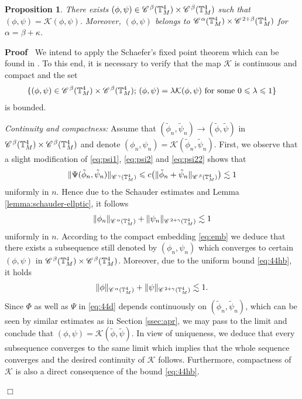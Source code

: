 \documentclass[a4paper,11pt]{article}
\newenvironment{proof}{\noindent\textbf{Proof\ }}{\hspace*{\fill}$\Box$\medskip}
\newtheorem{proposition}[theorem]{Proposition}
\numberwithin{equation}{section}
\newcommand{\CC}{\mathscr{C} \hspace{.1em}}
\newcommand{\8}{\infty}
\begin{document}
\begin{proposition}\label{prop:fixp}
There exists $(\phi,\psi)\in\CC^{\beta}(\mathbb{T}_{M}^{4})\times \CC^{\beta}(\mathbb{T}_{M}^{4})$ such that $(\phi,\psi)=\mathcal{K}(\phi,\psi).$ Moreover, $(\phi,\psi)$ belongs to $\CC^{\alpha} (\mathbb{T}_{M}^{4})\times \CC^{2+\beta}(\mathbb{T}_{M}^{4})$ for $\alpha=\beta+\kappa$.
\end{proposition}


\begin{proof}
We intend to apply the Schaefer's fixed point theorem which can be found in \cite[Section 9.2.2, Theorem 4]{E98}. To this end, it is necessary to verify that the map $\mathcal{K}$ is continuous and compact and the set
\begin{equation}\label{eq:44f}
\{(\phi,\psi)\in\CC^{\beta}(\mathbb{T}_{M}^{4})\times \CC^{\beta}(\mathbb{T}_{M}^{4});\, (\phi,\psi)=\lambda\mathcal{K}(\phi,\psi) \text{ for some } 0\leqslant \lambda\leqslant 1\}
\end{equation}
is bounded.

\emph{Continuity and compactness:} Assume that $(\tilde\phi_{n},\tilde\psi_{n})\to(\tilde\phi,\tilde\psi)$ in $\CC^{\beta}(\mathbb{T}_{M}^{4})\times \CC^{\beta}(\mathbb{T}_{M}^{4})$ and denote $(\phi_{n},\psi_{n})=\mathcal{K}(\tilde\phi_{n},\tilde\psi_{n}).$ First, we observe that a slight modification of \eqref{eq:psi1}, \eqref{eq:psi2} and \eqref{eq:psi22} shows that
\begin{equation}\label{eq:44ha}
\|\Psi(\tilde\phi_{n},\tilde\psi_{n})\|_{\CC^{\gamma}(\mathbb{T}_{M}^{4})}\leqslant c\big(\|\tilde\phi_{n}+\tilde\psi_{n}\|_{\CC^{\beta}(\mathbb{T}_{M}^{4})}\big)\lesssim 1
\end{equation}
uniformly in $n$. Hence due to the Schauder estimates and Lemma \ref{lemma:schauder-ellptic}, it follows
\begin{equation}\label{eq:44hb}
\|\phi_{n}\|_{\CC^{\alpha}(\mathbb{T}_{M}^{4})}+\|\psi_{n}\|_{\CC^{2+\gamma}(\mathbb{T}_{M}^{4})}\lesssim 1
\end{equation}
uniformly in $n$.
According to the compact embedding \eqref{eq:emb} we deduce that there exists a subsequence still denoted by $(\phi_{n},\psi_{n})$ which converges to certain $(\phi,\psi)$ in $\CC^{\beta}(\mathbb{T}_{M}^{4})\times \CC^{\beta}(\mathbb{T}_{M}^{4})$. Moreover, due to the  uniform bound \eqref{eq:44hb}, it holds
\begin{equation*}
\|\phi\|_{\CC^{\alpha}(\mathbb{T}_{M}^{4})}+\|\psi\|_{\CC^{2+\gamma}(\mathbb{T}_{M}^{4})}\lesssim 1.
\end{equation*}
Since $\Phi$ as well as $\Psi$ in \eqref{eq:44d} depends continuously on $(\tilde\phi_{n},\tilde\psi_{n})$, which can be seen by similar estimates as in Section \ref{ssec:apr}, we may pass to the limit and conclude that $(\phi,\psi)=\mathcal{K}(\tilde\phi,\tilde\psi)$. In view of uniqueness, we deduce that every subsequence converges to the same limit which implies that the whole sequence converges and the desired  continuity of $\mathcal{K}$ follows.
Furthermore, compactness of  $\mathcal{K}$ is also a direct consequence of the bound \eqref{eq:44hb}.




\end{proof}
\end{document}
